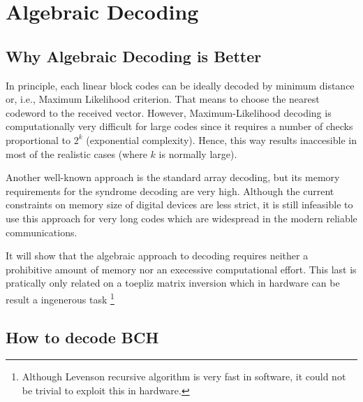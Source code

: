 

\chapter{Algebraic Decoding}

\section{Why Algebraic Decoding is Better}

In principle, each linear block codes can be ideally decoded by minimum distance or, i.e., Maximum Likelihood criterion. That means to choose the nearest codeword to the received vector. However, Maximum-Likelihood decoding is computationally very difficult for large codes since it requires a number of checks proportional to $2^k$ (exponential complexity). Hence, this way results inaccesible in most of the realistic cases (where $k$ is normally large).  

Another well-known approach is the standard array decoding, but its memory requirements for the syndrome decoding are very high. Although the current constraints on memory size of digital devices are less strict, it is still infeasible to use this approach for very long codes which are widespread in the modern reliable communications. 

It will show that the algebraic approach to decoding requires neither a prohibitive amount of memory nor an execessive computational effort. This last is pratically only related on a toepliz matrix inversion which in hardware can be result a ingenerous task \footnote{Although Levenson recursive algorithm is very fast in software, it could not be trivial to exploit this in hardware.}  

\section{How to decode BCH}    


   

    

    